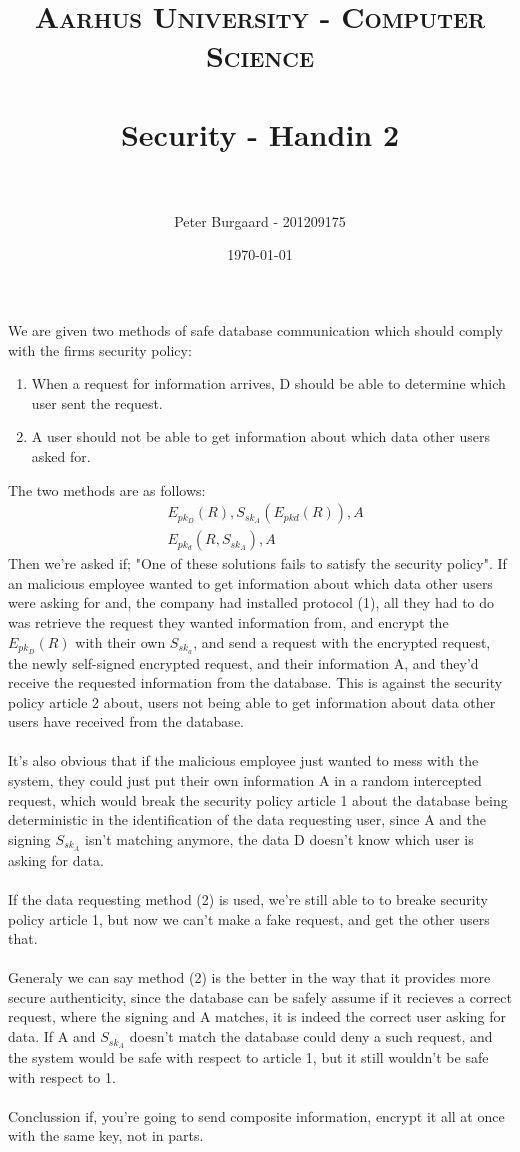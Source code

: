 \documentclass[paper=a4, fontsize=11pt]{scrartcl} %
\title{	
	\normalfont \normalsize 
	\textsc{Aarhus University - Computer Science} \\ [25pt] %
	\horrule{0.5pt} \\[0.4cm] %
	\huge Security - Handin 2 \\ %
	\horrule{2pt} \\[0.5cm] %
}
\author{Peter Burgaard - 201209175} %
\date{\normalsize\today} %
\begin{document}
	
	\maketitle %
	
	We are given two methods of safe database communication which should comply with the firms security policy:
	\begin{enumerate}
		\item When a request for information arrives, D should be able to determine which user sent the request.
		\item A user should not be able to get information about which data other users asked for.
	\end{enumerate}
	The two methods are as follows:
	\begin{align}
	& E_{pk_D}(R),S_{sk_A}(E_{pkd}(R)),A \\
	& E_{pk_d}(R,S_{sk_A}),A
	\end{align}
	Then we're asked if; "One of these solutions fails to satisfy the security policy". If an malicious employee wanted to get information about which data other users were asking for and, the company had installed protocol (1), all they had to do was retrieve the request they wanted information from, and encrypt the $E_{pk_D}(R)$ with their own $S_{sk_a}$, and send a request with the encrypted request, the newly self-signed encrypted request, and their information A, and they'd receive the requested information from the database. This is against the security policy article 2 about, users not being able to get information about data other users have received from the database. \\ \\
	It's also obvious that if the malicious employee just wanted to mess with the system, they could just put their own information A in a random intercepted request, which would break the security policy article 1 about the database being deterministic in the identification of the data requesting user, since A and the signing $S_{sk_A}$ isn't matching anymore, the data D doesn't know which user is asking for data. \\ \\
	If the data requesting method (2) is used, we're still able to to breake security policy article 1, but now we can't make a fake request, and get the other users that. \\ \\
	Generaly we can say method (2) is the better in the way that it provides more secure authenticity, since the database can be safely assume if it recieves a correct request, where the signing and A matches, it is indeed the correct user asking for data. If A and $S_{sk_A}$ doesn't match the database could deny a such request, and the system would be safe with respect to article 1, but it still wouldn't be safe with respect to 1. \\ \\
	Conclussion if, you're going to send composite information, encrypt it all at once with the same key, not in parts.
\end{document}
